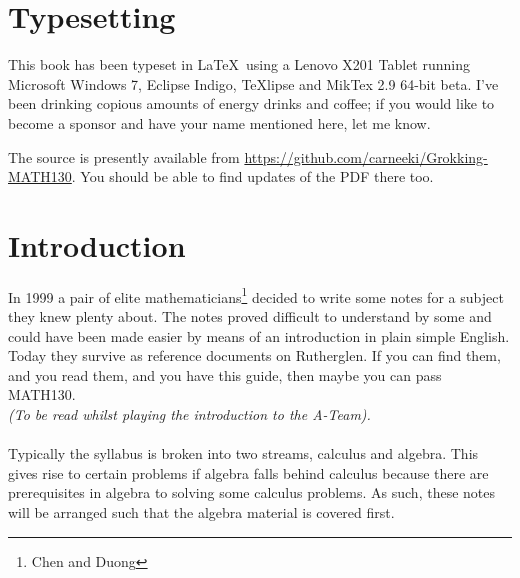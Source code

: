 \section{Typesetting}
This book has been typeset in \LaTeX~using a Lenovo X201 Tablet running
Microsoft Windows 7, Eclipse Indigo, TeXlipse and MikTex 2.9 64-bit beta. I've
been drinking copious amounts of energy drinks and coffee; if you would like to
become a sponsor and have your name mentioned here, let me know.

The source is presently available from
\url{https://github.com/carneeki/Grokking-MATH130}. You should be able to find
updates of the PDF there too.

\section{Introduction}
\label{sec:Introduction}
In 1999 a pair of elite mathematicians\footnote{Chen and Duong} decided to
write some notes for a subject they knew plenty about. The notes proved
difficult to understand by some and could have been made easier by means of an
introduction in plain simple English. Today they survive as reference documents
on Rutherglen. If you can find them, and you read them, and you have this
guide, then maybe you can pass MATH130.\\
\emph{(To be read whilst playing the introduction to the A-Team).}\\
\\
Typically the syllabus is broken into two streams, calculus and algebra. This
gives rise to certain problems if algebra falls behind calculus because
there are prerequisites in algebra to solving some calculus problems. As such,
these notes will be arranged such that the algebra material is covered first.